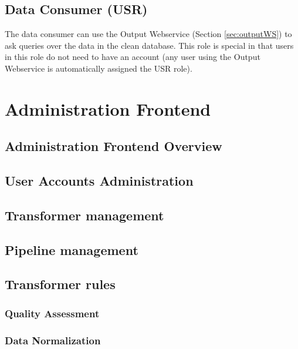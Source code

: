 \section[Data Consumer]{Data Consumer (USR)} 
  The data consumer can use the Output Webservice (Section \ref{sec:outputWS}) to ask queries over the data in the clean database. This role is special in that users in this role do not need to have an account (any user using the Output Webservice is automatically assigned the USR role).


\chapter{Administration Frontend}

\section{Administration Frontend Overview}

\section{User Accounts Administration}

\section{Transformer management}
\label{sec:transformerManagement}

\section{Pipeline management}
\label{sec:pipelineManagement}

\section{Transformer rules}
\label{sec:transformerRules}

\subsection*{Quality Assessment}

\subsection*{Data Normalization}

